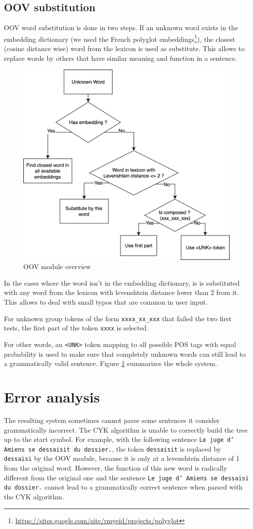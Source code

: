 \documentclass[11pt]{article}
\begin{document}
    \subsection{OOV substitution}
    OOV word substitution is done in two steps. If an unknown word exists in 
    the embedding dictionary (we used the French polyglot embeddings\footnote{
    \url{https://sites.google.com/site/rmyeid/projects/polyglot}}), the closest 
    (cosine distance wise) word from the lexicon is used as substitute. This 
    allows to replace words by others that have similar meaning and function in 
    a sentence.
    \begin{figure}[h]
        \centering
        \includegraphics[width=.4\linewidth]{oov.png}
        \caption{OOV module overview}
        \label{fig:oov}
    \end{figure}

    In the cases where the word isn't in the embedding dictionary, is is 
    substituted with any word from the lexicon with levenshtein distance lower 
    than 2 from it. This allows to deal with small typos that are common in 
    user input. 

    For unknown group tokens of the form \texttt{xxxx\_xx\_xxx} that failed 
    the two first tests, the first part of the token \texttt{xxxx} is selected. 

    For other words, an \texttt{<UNK>} token mapping to all possible POS tags 
    with equal probability is used to make sure that completely unknown words 
    can still lead to a grammatically valid sentence. Figure \ref{fig:oov} 
    summarizes the whole system.

    \section{Error analysis}
    The resulting system sometimes cannot parse some sentences it consider 
    grammatically incorrect.
    The CYK algorithm is unable to correctly build the tree up to the start
    symbol. For 
    example, with the following sentence
    \texttt{Le juge d' Amiens se dessaisit du dossier.}, the token 
    \texttt{dessaisit} is replaced by \texttt{dessaisi} by the OOV module, 
    because it is only at a levenshtein distance of 1 from the original word. 
    However, the function of 
    this new word is radically different from the original one and the sentence
    \texttt{Le juge d' Amiens se dessaisi du dossier.} cannot lead to a 
    grammatically correct sentence when parsed with the CYK algorithm.
\end{document}
